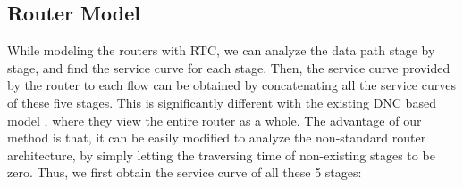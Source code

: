 \documentclass[10pt,journal]{IEEEtran}
\begin{document}
\subsection{Router Model}\label{router}
While modeling the routers with RTC, we can analyze the data path stage by stage, and find the service curve for each stage. Then, the service curve provided by the router to each flow can be obtained by concatenating all the service curves of these five stages. This is significantly different with the existing DNC based model \cite{qian2009analysis,Qian489900}, where they view the entire router as a whole. The advantage of our method is that, it can be easily modified to analyze the non-standard router architecture, by simply letting the traversing time of non-existing stages to be zero. Thus, we first obtain the service curve of all these 5 stages:
\begin{figure}
  \centering
  \hspace{10pt}

\end{figure}
\end{document}
